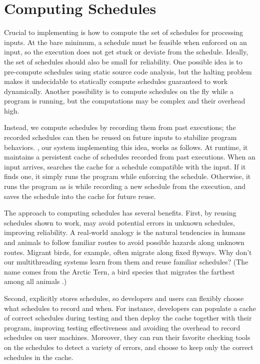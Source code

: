 \section{Computing Schedules} \label{sec:tern}


Crucial to implementing \smt is how to compute the set of schedules for
processing inputs.  At the bare minimum, a schedule must be feasible when
enforced on an input, so the execution does not get stuck or deviate from
the schedule.  Ideally, the set of schedules should also be small for
reliability.  One possible idea is to pre-compute schedules using static
source code analysis, but the halting problem makes it undecidable to
statically compute schedules guaranteed to work dynamically.  Another
possibility is to compute schedules on the fly while a program is running,
but the computations may be complex and their overhead high.

Instead, we compute schedules by recording them from past executions; the
recorded schedules can then be reused on future inputs to stabilize
program behaviors.  \tern, our system implementing this idea, works as
follows.  At runtime, it maintains a persistent cache of schedules
recorded from past executions.  When an input arrives, \tern searches the
cache for a schedule compatible with the input.  If it finds one, it
simply runs the program while enforcing the schedule.  Otherwise, it runs
the program as is while recording a new schedule from the execution, and
saves the schedule into the cache for future reuse.

The \tern approach to computing schedules has several benefits. First, by
reusing schedules shown to work, \tern may avoid potential errors in
unknown schedules, improving reliability.  A real-world analogy is the
natural tendencies in humans and animals to follow familiar routes to
avoid possible hazards along unknown routes.  Migrant birds, for example,
often migrate along fixed flyways.  Why don't our multithreading systems
learn from them and reuse familiar schedules?  (The name \tern comes from
the Arctic Tern, a bird species that migrates the farthest among all
animals%
.)

Second, \tern explicitly stores schedules, so developers and users can
flexibly choose what schedules to record and when.  For instance,
developers can populate a cache of correct schedules during testing and
then deploy the cache together with their program, improving testing
effectiveness and avoiding the overhead to record schedules on user
machines.  Moreover, they can run their favorite checking tools on the
schedules to detect a variety of errors, and choose to keep only the
correct schedules in the cache.

